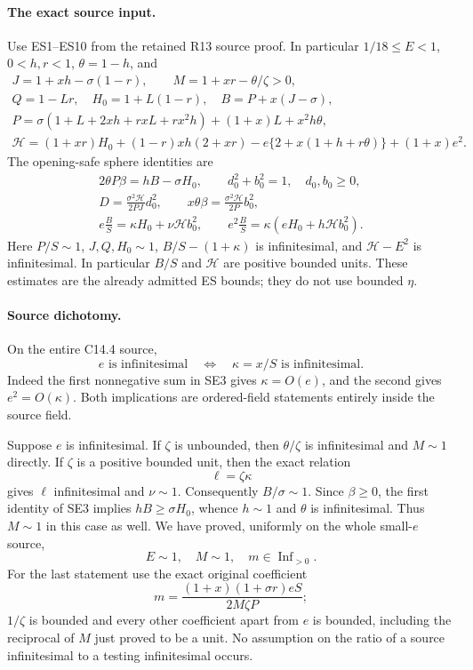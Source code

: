 \paragraph{The exact source input.}
Use ES1--ES10 from the retained R13 source proof. In particular
$1/18\le E<1$, $0<h,r<1$, $\theta=1-h$, and
\[
\begin{gathered}
 J=1+xh-\sigma(1-r),\qquad M=1+xr-\theta/\zeta>0,\\
 Q=1-Lr,\quad H_0=1+L(1-r),\quad B=P+x(J-\sigma),\\
 P=\sigma(1+L+2xh+rxL+rx^2h)+(1+x)L+x^2h\theta,\\
 \mathcal H=(1+xr)H_0+(1-r)xh(2+xr)
       -e\{2+x(1+h+r\theta)\}+(1+x)e^2.
\end{gathered} \tag{SE2}
\]
The opening-safe sphere identities are
\[
\begin{gathered}
 2\theta P\beta=hB-\sigma H_0,\qquad
 d_0^2+b_0^2=1,\quad d_0,b_0\ge0,\\
 D=\frac{\sigma^2\mathcal H}{2PJ}d_0^2,\qquad
 x\theta\beta=\frac{\sigma^2\mathcal H}{2P}b_0^2,\\
 e\frac BS=\kappa H_0+\nu\mathcal H b_0^2,\qquad
 e^2\frac BS=\kappa(eH_0+h\mathcal H b_0^2).
\end{gathered}\tag{SE3}
\]
Here $P/S\sim1$, $J,Q,H_0\sim1$, $B/S-(1+\kappa)$ is
infinitesimal, and $\mathcal H-E^2$ is infinitesimal. In particular
$B/S$ and $\mathcal H$ are positive bounded units. These estimates
are the already admitted ES bounds; they do not use bounded $\eta$.

\paragraph{Source dichotomy.}
On the entire C14.4 source,
\[
 e\text{ is infinitesimal}\quad\Longleftrightarrow\quad
 \kappa=x/S\text{ is infinitesimal}.\tag{SE4}
\]
Indeed the first nonnegative sum in SE3 gives $\kappa=O(e)$,
and the second gives $e^2=O(\kappa)$. Both implications are
ordered-field statements entirely inside the source field.

Suppose $e$ is infinitesimal. If $\zeta$ is unbounded, then
$\theta/\zeta$ is infinitesimal and $M\sim1$ directly. If $\zeta$
is a positive bounded unit, then the exact relation
\[
                  \ell=\zeta\kappa\tag{SE5}
\]
gives $\ell$ infinitesimal and $\nu\sim1$. Consequently
$B/\sigma\sim1$. Since $\beta\ge0$, the first identity of SE3
implies $hB\ge\sigma H_0$, whence $h\sim1$ and $\theta$ is
infinitesimal. Thus $M\sim1$ in this case as well. We have proved,
uniformly on the whole small-$e$ source,
\[
                    E\sim1,\quad M\sim1,\quad m\in\operatorname{Inf}_{>0}.
                    \tag{SE6}
\]
For the last statement use the exact original coefficient
\[
 m=\frac{(1+x)(1+\sigma r)eS}{2M\zeta P};\tag{SE7}
\]
$1/\zeta$ is bounded and every other coefficient apart from $e$ is
bounded, including the reciprocal of $M$ just proved to be a unit.
No assumption on the ratio of a source infinitesimal to a testing
infinitesimal occurs.

